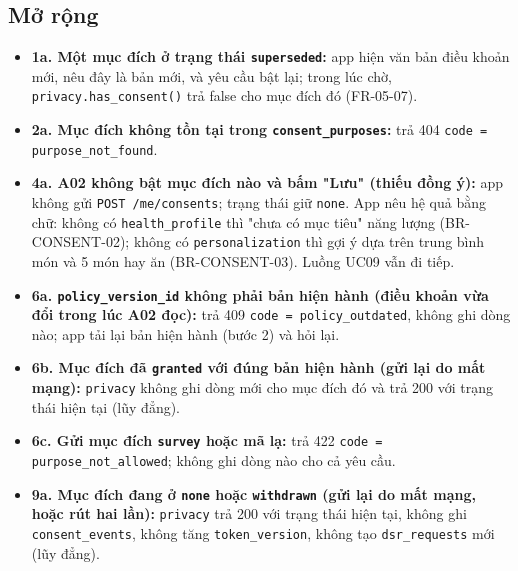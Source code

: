\subsection{Mở rộng}
\begin{itemize}
\item \textbf{1a. Một mục đích ở trạng thái {\small\texttt{superseded}}:} app hiện văn bản điều khoản mới, nêu đây là bản mới, và yêu cầu bật lại; trong lúc chờ, {\small\texttt{privacy.\allowbreak{}has\_\allowbreak{}\allowbreak{}consent()}} trả false cho mục đích đó (FR-\allowbreak{}05-\allowbreak{}07).
\item \textbf{2a. Mục đích không tồn tại trong {\small\texttt{consent\_\allowbreak{}\allowbreak{}purposes}}:} trả 404 {\small\texttt{code = purpose\_\allowbreak{}\allowbreak{}not\_\allowbreak{}\allowbreak{}found}}.
\item \textbf{4a. A02 không bật mục đích nào và bấm "Lưu" (thiếu đồng ý):} app không gửi {\small\texttt{POST /\allowbreak{}\allowbreak{}me/\allowbreak{}\allowbreak{}consents}}; trạng thái giữ {\small\texttt{none}}. App nêu hệ quả bằng chữ: không có {\small\texttt{health\_\allowbreak{}\allowbreak{}profile}} thì "chưa có mục tiêu" năng lượng (BR-\allowbreak{}CONSENT-\allowbreak{}02); không có {\small\texttt{personalization}} thì gợi ý dựa trên trung bình món và 5 món hay ăn (BR-\allowbreak{}CONSENT-\allowbreak{}03). Luồng UC09 vẫn đi tiếp.
\item \textbf{6a. {\small\texttt{policy\_\allowbreak{}\allowbreak{}version\_\allowbreak{}\allowbreak{}id}} không phải bản hiện hành (điều khoản vừa đổi trong lúc A02 đọc):} trả 409 {\small\texttt{code = policy\_\allowbreak{}\allowbreak{}outdated}}, không ghi dòng nào; app tải lại bản hiện hành (bước 2) và hỏi lại.
\item \textbf{6b. Mục đích đã {\small\texttt{granted}} với đúng bản hiện hành (gửi lại do mất mạng):} {\small\texttt{privacy}} không ghi dòng mới cho mục đích đó và trả 200 với trạng thái hiện tại (lũy đẳng).
\item \textbf{6c. Gửi mục đích {\small\texttt{survey}} hoặc mã lạ:} trả 422 {\small\texttt{code = purpose\_\allowbreak{}\allowbreak{}not\_\allowbreak{}\allowbreak{}allowed}}; không ghi dòng nào cho cả yêu cầu.
\item \textbf{9a. Mục đích đang ở {\small\texttt{none}} hoặc {\small\texttt{withdrawn}} (gửi lại do mất mạng, hoặc rút hai lần):} {\small\texttt{privacy}} trả 200 với trạng thái hiện tại, không ghi {\small\texttt{consent\_\allowbreak{}\allowbreak{}events}}, không tăng {\small\texttt{token\_\allowbreak{}\allowbreak{}version}}, không tạo {\small\texttt{dsr\_\allowbreak{}\allowbreak{}requests}} mới (lũy đẳng).

\end{itemize}
